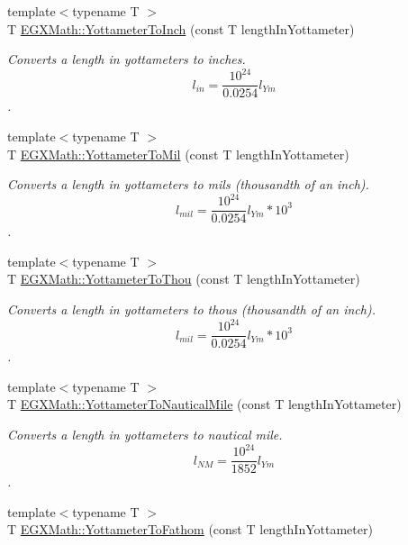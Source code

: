 \begin{DoxyCompactItemize}
{\footnotesize template$<$typename T $>$ }\\T \mbox{\hyperlink{group___e_g_x_math-_conversions-_length_conversions-_s_i-_yottameter-_imperial_ga6de8b1bd4812d6814328cb5d54adf08c}{E\+G\+X\+Math\+::\+Yottameter\+To\+Inch}} (const T length\+In\+Yottameter)
\begin{DoxyCompactList}\small\item\em Converts a length in yottameters to inches. \[ l_{in}= \frac{10^{24}}{0.0254} l_{Ym} \]. \end{DoxyCompactList}\item 
{\footnotesize template$<$typename T $>$ }\\T \mbox{\hyperlink{group___e_g_x_math-_conversions-_length_conversions-_s_i-_yottameter-_imperial_ga71ee7b2256fffaec2663bd2eafc30a9d}{E\+G\+X\+Math\+::\+Yottameter\+To\+Mil}} (const T length\+In\+Yottameter)
\begin{DoxyCompactList}\small\item\em Converts a length in yottameters to mils (thousandth of an inch). \[ l_{mil}= \frac{10^{24}}{0.0254} l_{Ym} * 10^{3} \]. \end{DoxyCompactList}\item 
{\footnotesize template$<$typename T $>$ }\\T \mbox{\hyperlink{group___e_g_x_math-_conversions-_length_conversions-_s_i-_yottameter-_imperial_ga9bf8eeca799b8246932d4aeaac425d87}{E\+G\+X\+Math\+::\+Yottameter\+To\+Thou}} (const T length\+In\+Yottameter)
\begin{DoxyCompactList}\small\item\em Converts a length in yottameters to thous (thousandth of an inch). \[ l_{mil}= \frac{10^{24}}{0.0254} l_{Ym} * 10^{3} \]. \end{DoxyCompactList}\item 
{\footnotesize template$<$typename T $>$ }\\T \mbox{\hyperlink{group___e_g_x_math-_conversions-_length_conversions-_s_i-_yottameter-_nautical_ga455b7f16dd9ff68f759f366def111300}{E\+G\+X\+Math\+::\+Yottameter\+To\+Nautical\+Mile}} (const T length\+In\+Yottameter)
\begin{DoxyCompactList}\small\item\em Converts a length in yottameters to nautical mile. \[ l_{NM}= \frac{10^{24}}{1852} l_{Ym} \]. \end{DoxyCompactList}\item 
{\footnotesize template$<$typename T $>$ }\\T \mbox{\hyperlink{group___e_g_x_math-_conversions-_length_conversions-_s_i-_yottameter-_nautical_ga602afc490045a91db8931798e6ee4bbd}{E\+G\+X\+Math\+::\+Yottameter\+To\+Fathom}} (const T length\+In\+Yottameter)

\end{DoxyCompactItemize}
